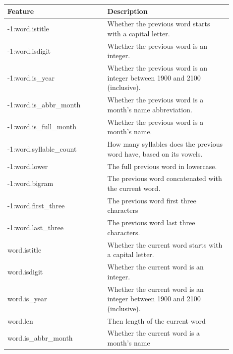 \documentclass[a4paper, conference]{ieeeconf}
\begin{document}
  \begin{table}[ht!]
    \centering
    \begin{tabular}{|p{0.4\linewidth}|p{0.5\linewidth}|}
      \hline
      \textbf{Feature} & \textbf{Description} \\
      \hline
      \rowcolor{dark_blue}
      -1:word.istitle & Whether the previous word starts with a capital letter.
      \\
      \hline
      \rowcolor{dark_blue}
      -1:word.isdigit & Whether the previous word is an integer. \\
      \hline
      \rowcolor{dark_blue}
      -1:word.is\_year & Whether the previous word is an integer between 1900
      and 2100 (inclusive). \\
      \hline
      \rowcolor{dark_blue}
      -1:word.is\_abbr\_month & Whether the previous word is a month's name
      abbreviation. \\
      \hline
      \rowcolor{dark_blue}
      -1:word.is\_full\_month & Whether the previous word is a month's name. \\
      \hline
      \rowcolor{dark_blue}
      -1:word.syllable\_count & How many syllables does the previous word have,
      based on its vowels. \\
      \hline
      \rowcolor{dark_blue}
      -1:word.lower & The full previous word in lowercase. \\
      \hline
      \rowcolor{dark_blue}
      -1:word.bigram & The previous word concatenated with the current word. \\
      \hline
      \rowcolor{dark_blue}
      -1:word.first\_three & The previous word first three characters \\
      \hline
      \rowcolor{dark_blue}
      -1:word.last\_three & The previous word last three characters. \\
      \hline
      \rowcolor{blue}
      word.istitle & Whether the current word starts with a capital letter. \\
      \hline
      \rowcolor{blue}
      word.isdigit & Whether the current word is an integer. \\
      \hline
      \rowcolor{blue}
      word.is\_year & Whether the current word is an integer between 1900
      and 2100 (inclusive). \\
      \hline
      \rowcolor{blue}
      word.len & Then length of the current word \\
      \hline
      \rowcolor{blue}
      word.is\_abbr\_month & Whether the current word is a month's name

\end{tabular}
\end{table}
\end{document}
